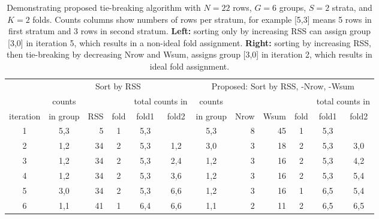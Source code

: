 \documentclass[twoside]{article}
\begin{document}
\begin{table}[t]
  \small
  \centering
  \begin{tabular}{c|crccc|crrccc}
    & \multicolumn{5}{c|}{Sort by RSS} &\multicolumn{6}{c}{Proposed: Sort by RSS, -Nrow, -Wsum} \\
    &counts&     &&\multicolumn{2}{c|}{total counts in}&counts& & &&\multicolumn{2}{c}{total counts in}\\
    iteration&  in group&   RSS &   fold& fold1 & fold2  &in group&Nrow & Wsum&fold& fold1 & fold2\\
    \hline
1&    5,3&     5    &     1 &   5,3 &     & 5,3    &  8  &45 & 1 &   5,3 &    \\
2&    1,2&    34    &     2 &   5,3 &   1,2  & 3,0    &  3  & 18 & 2 &   5,3 &   3,0\\
3&    1,2&    34    &     2 &   5,3 &   2,4  & 1,2    &  3  & 16 & 2 &   5,3 &   4,2\\
4&    1,2&    34    &     2 &   5,3 &   3,6  & 1,2    &  3  & 16 & 2 &   5,3 &   5,4\\
5&    3,0&    34    &     2 &   5,3 &   6,6  & 1,2    &  3  & 16 & 1 &   6,5 &   5,4\\
6&    1,1&    41    &     1 &   6,4 &   6,6  & 1,1    &  2  & 11 & 2 &   6,5 &   6,5
  \end{tabular}
  \caption{
    Demonstrating proposed tie-breaking algorithm with $N=22$ rows, $G=6$ groups, $S=2$ strata, and $K=2$ folds.
    Counts columns show numbers of rows per stratum, for example [5,3] means 5 rows in first stratum and 3 rows in second stratum.
    \textbf{Left:} sorting only by increasing RSS can assign group [3,0] in iteration 5, which results in a non-ideal fold assignment.
    \textbf{Right:} sorting by increasing RSS, then tie-breaking by decreasing Nrow and Wsum, assigns group [3,0] in iteration 2, which results in ideal fold assignment.
  }
  \label{tab:ties}
\end{table}
\end{document}
